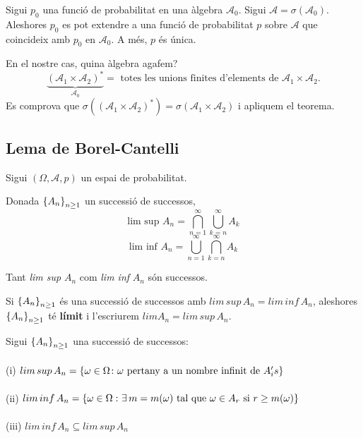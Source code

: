 \begin{thm}
  Sigui $p_{0}$ una funció de probabilitat en una àlgebra $\mathcal{A}_{0}$. Sigui $\mathcal{A} = \sigma(\mathcal{A}_{0})$. \\
  Aleshores $p_{0}$ es pot extendre a una funció de probabilitat $p$ sobre $\mathcal{A}$ que coincideix amb $p_{0}$ en $\mathcal{A}_{0}$. A més, $p$ és única.
\end{thm}

En el nostre cas, quina àlgebra agafem? 
\[
    \underbrace{(\mathcal{A}_{1}\times\mathcal{A}_{2})^{*}}_{\mathcal{A}_{0}} = \text{ totes les unions finites d'elements de } \mathcal{A}_{1}\times\mathcal{A}_{2}.
\]
Es comprova que $\sigma((\mathcal{A}_{1}\times\mathcal{A}_{2})^{*}) = \sigma(\mathcal{A}_{1}\times\mathcal{A}_{2})$ i apliquem el teorema.

\subsection{Lema de Borel-Cantelli}

Sigui $(\Omega, \mathcal{A}, p)$ un espai de probabilitat.

\begin{defi}
  Donada $\left\{A_{n}\right\}_{n\geq 1}$ un successió de successos, 
  \[
    \text{lim sup } A_{n} = \bigcap\limits_{n=1}^{\infty}\bigcup\limits_{k=n}^{\infty}A_{k}
  \]
  \[
    \text{lim inf } A_{n} = \bigcup\limits_{n=1}^{\infty}\bigcap\limits_{k=n}^{\infty}A_{k}
  \]
\end{defi}

\begin{obs}
  Tant \textit{lim sup} $A_{n}$ com \textit{lim inf} $A_{n}$ són successos.
\end{obs}

\begin{defi}
  Si $\left\{A_{n}\right\}_{n\geq 1}$ és una successió de successos amb $lim \, sup\, A_{n} = lim\, inf\, A_{n}$, aleshores $\left\{A_{n}\right\}_{n\geq 1}$ té \textbf{límit} i l'escriurem $lim A_{n} = lim \, sup \, A_{n}$.
\end{defi}

\newpage

\begin{properties}
  Sigui $\left\{A_{n}\right\}_{n\geq 1}$ una successió de successos: \\\\
  (i) $lim \, sup \, A_{n} = \left\{\omega \in \Omega \colon \omega \text{ pertany a un nombre infinit de } A_{i}'s\right\}$ \\\\
  (ii) $lim \, inf \, A_{n} = \left\{\omega \in \Omega\, \colon \exists \, m = m(\omega) \text{ tal que } \omega\in A_{r} \text{ si } r \geq m(\omega)\right\}$ \\\\
  (iii) $lim \, inf\, A_{n} \subseteq lim\, sup \, A_{n}$ \\
\end{properties}

